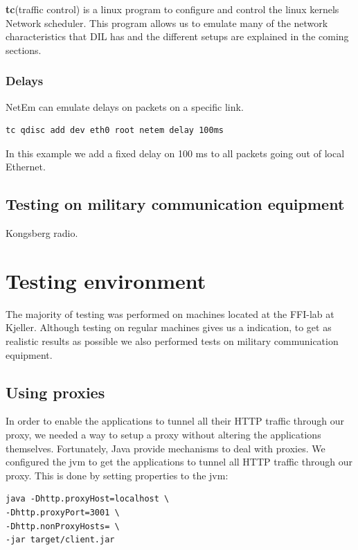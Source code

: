 \textbf{tc}(traffic control) is a linux program to configure and control the
linux kernels Network scheduler. This program allows us to emulate many of the
network characteristics that DIL has and the different setups are explained in
the coming sections.

\subsubsection{Delays}

NetEm can emulate delays on packets on a specific link.

\begin{lstlisting}[frame=single, caption="Emulating delay"]
  tc qdisc add dev eth0 root netem delay 100ms
\end{lstlisting}

In this example we add a fixed delay on 100 ms to all packets going out of local
Ethernet.

\subsection{Testing on military communication equipment}
Kongsberg radio.


\section{Testing environment}
\label{testing-environment}

The majority of testing was performed on machines located at the FFI-lab at
Kjeller. Although testing on regular machines gives us a indication, to get as
realistic results as possible we also performed tests on military communication
equipment.

\subsection{Using proxies}

In order to enable the applications to tunnel all their HTTP traffic through our
proxy, we needed a way to setup a proxy without altering the applications
themselves. Fortunately, Java provide mechanisms to deal with
proxies\cite{oracle-proxy}. We configured the \gls{jvm} to get the applications
to tunnel all HTTP traffic through our proxy. This is done by setting properties
to the \gls{jvm}:


\begin{lstlisting}[frame=single, caption="Setting a proxy on the \gls{jvm}", label=test]
java -Dhttp.proxyHost=localhost \
-Dhttp.proxyPort=3001 \
-Dhttp.nonProxyHosts= \
-jar target/client.jar
\end{lstlisting}

